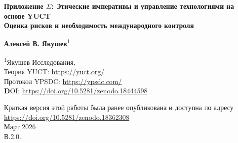 \documentclass[12pt,a4paper]{article}
\theoremstyle{remark}
\begin{document}
	
	\begin{titlepage}
		\begin{center}
			\vspace*{1cm}
			
			\Huge\textbf{Приложение $\Sigma$: Этические императивы и управление технологиями на основе YUCT} \\
			\vspace{0.5cm}
			\Large\textbf{Оценка рисков и необходимость международного контроля}
			
			\vspace{1.5cm}
			
			\Large\textbf{Алексей В. Якушев\textsuperscript{1}}
			
			\vspace{0.3cm}
			\large
			\textsuperscript{1}Якушев Исследования, \\ 
			Теория YUCT: \url{https://yuct.org/}\\
			Протокол YPSDC: \url{https://ypsdc.com/}\\
			
			\vspace{2cm}
			\textbf DOI: \url{https://doi.org/10.5281/zenodo.18444598}\\
			
			\vspace{1cm}
			
			\vspace{0cm}
			\large 
			Краткая версия этой работы была ранее опубликована и доступна по адресу\\ \url{https://doi.org/10.5281/zenodo.18362308}\\
			\vspace{1cm}
			Март 2026 \\ \large В.2.0.
			
			\vspace{1cm}
			\newpage
			\begin{minipage}{0.9\textwidth}
				\begin{abstract}
					\noindent
					Объединяющая теория координации Якушева (YUCT) обеспечивает математическую основу, объединяющую физику, химию, биологию и социальные науки. Её практические приложения — от точной химии и геофизической разведки до экономического прогнозирования и когнитивного усиления — несут беспрецедентный потенциал как для блага, так и для вреда. В этом приложении систематически рассматриваются риски, связанные с ключевыми технологиями, производными от YUCT, а также новые генеративные научные дисциплины, порождённые теорией. Мы утверждаем, что сама мощь этих инструментов требует нового уровня глобального управления, основанного не на запретах, а на контроле, паритете развития и сознательном расширении границ применимости. Опираясь на успешные прецеденты ядерного нераспространения, мы предлагаем многоуровневую международную архитектуру, включающую рамочный договор, контрольный орган, режимы экспортного контроля и обязательные резолюции Совета Безопасности ООН. Особое внимание уделяется эффектам масштабирования — от планетарного до космологического уровней — и необходимости превентивного этического осмысления.
				\end{abstract}
			\end{minipage}
			

\end{center}
\end{titlepage}
\end{document}
